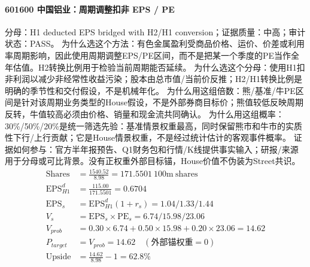 \paragraph{601600 中国铝业：周期调整扣非 EPS / PE}
分母：H1 deducted EPS bridged with H2/H1 conversion；证据质量：中高；审计状态：PASS。
为什么选这个方法：有色金属盈利受商品价格、运价、价差或利用率周期影响，因此使用周期调整EPS/PE区间，而不是把某一个季度的PE当作全年估值。H2转换比例用于检验当前周期能否延续。
为什么选这个分母：使用H1扣非利润以减少非经常性收益污染；股本由总市值/当前价反推；H2/H1转换比例是明确的季节性和交付假设，不是机械年化。
为什么用这组倍数：熊/基准/牛PE区间是针对该周期业务类型的House假设，不是外部券商目标价；熊值较低反映周期反转，牛值较高必须由价格、销量和现金流共同确认。
为什么用这组概率：30\%/50\%/20\%是统一筛选先验：基准情景权重最高，同时保留熊市和牛市的实质性下行/上行贡献；它是House情景权重，不是经过统计估计的客观事件概率。
证据如何参与：官方半年报预告、Q1财务包和行情/K线提供事实输入；研报/来源用于分母或可比背景。没有正权重外部目标锚，House价值不伪装为Street共识。
\begin{align*}
\mathrm{Shares} &= \frac{1540.52}{8.98}=171.5501\ \mathrm{100m\ shares}\\
\mathrm{EPS}_{H1}^d &= \frac{115.00}{171.5501}=0.6704\\
\mathrm{EPS}_s &= \mathrm{EPS}_{H1}^d(1+r_s)=1.04/1.33/1.44\\
V_s &= \mathrm{EPS}_s\times \mathrm{PE}_s=6.74/15.98/23.06\\
V_{prob} &= 0.30\times 6.74+0.50\times 15.98+0.20\times 23.06=14.62\\
P_{target} &= V_{prob}=14.62\quad(\text{外部锚权重}=0)\\
\mathrm{Upside} &= \frac{14.62}{8.98}-1=62.8\%\\
\end{align*}

